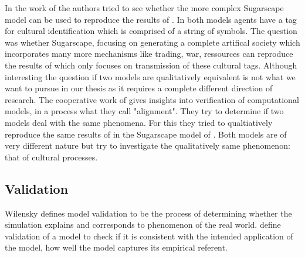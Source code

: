 In the work of \cite{axtell_aligning_1996} the authors tried to see whether the more complex Sugarscape model can be used to reproduce the results of \cite{axelrod_convergence_1995}. In both models agents have a tag for cultural identification which is comprised of a string of symbols. The question was whether Sugarscape, focusing on generating a complete artifical society which incorporates many more mechanisms like trading, war, ressources can reproduce the results of \cite{axelrod_convergence_1995} which only focuses on transmission of these cultural tags. Although interesting the question if two models are qualitatively equivalent is not what we want to pursue in our thesis as it requires a complete different direction of research. The cooperative work of \cite{axtell_aligning_1996} gives insights into verification of computational models, in a process what they call "alignment". They try to determine if two models deal with the same phenomena. For this they tried to qualtiatively reproduce the same results of \cite{axelrod_convergence_1995} in the Sugarscape model of \cite{epstein_growing_1996}. Both models are of very different nature but try to investigate the qualitatively same phenomenon: that of cultural processes.

\subsection{Validation}
Wilensky \cite{wilensky_making_2007} defines model validation to be the process of determining whether the simulation explains and corresponds to phenomenon of the real world. \cite{galan_errors_2009} define validation of a model to check if it is consistent with the intended application of the model, how well the model captures its empirical referent.

